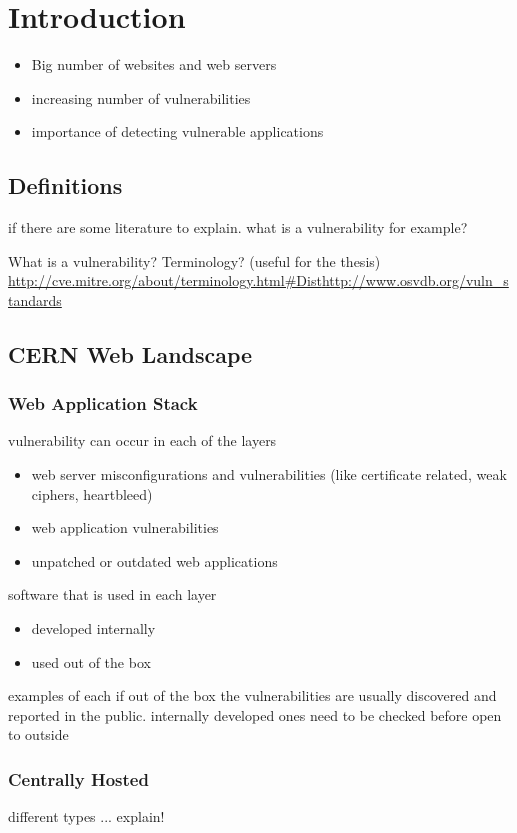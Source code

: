 \chapter{Introduction}
\thispagestyle{empty}

\begin{itemize}
\item Big number of websites and web servers
\item increasing number of vulnerabilities
\item importance of detecting vulnerable applications
\end{itemize}

\section{Definitions}
if there are some literature to explain. what is a vulnerability for example?

What is a vulnerability? Terminology? (useful for the thesis) 
\url{http://cve.mitre.org/about/terminology.html#Dist}\url{http://www.osvdb.org/vuln_standards}

\section{CERN Web Landscape}
\subsection{Web Application Stack}
vulnerability can occur in each of the layers
\begin{itemize}
\item web server misconfigurations and vulnerabilities (like certificate related, weak ciphers, heartbleed) 
\item web application vulnerabilities
\item unpatched or outdated web applications
\end{itemize}


software that is used in each layer
\begin{itemize}
\item developed internally
\item used out of the box
\end{itemize}
examples of each
if out of the box the vulnerabilities are usually discovered and reported in the public.
internally developed ones need to be checked before open to outside

\subsection{Centrally Hosted}
different types ... explain!
